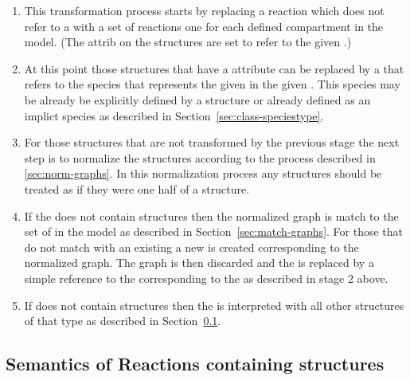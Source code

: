 \documentclass{cekarticle}
\begin{document}
\begin{enumerate}

\item This transformation process starts by replacing a reaction
which does not refer to a  with a set of
reactions one for each defined compartment in the model.  (The
 attrib on the 
structures are set to refer to the given .)

\item At this point those 
structures that have a  attribute can be
replaced by a  that refers to the species that
represents the given  in the given
.  This species may be already be explicitly
defined by a  structure or already defined as an
implict species as described in
Section~\ref{sec:class-speciestype}.

\item For those  structures that are
not transformed by the previous stage the next step is to
normalize the  structures according
to the process described in \ref{sec:norm-graphs}.  In this
normalization process any  structures should be
treated as if they were one half of a 
structure.

\item If the  does not contain 
structures then the normalized graph is match to the set of
 in the model as described in
Section~\ref{sec:match-graphs}.  For those that do not match with
an existing  a new  is
created corresponding to the normalized graph.  The graph is then
discarded and the  is replaced by a
simple reference to the  corresponding to the
 as described in stage 2 above.

\item If  does not contain 
structures then the  is interpreted with all other
 structures of that type as described in
Section~\ref{sec:reaction-semantics-GBs}.

\end{enumerate}

\subsection{Semantics of Reactions containing  structures}
\label{sec:reaction-semantics-GBs}
\end{document}
